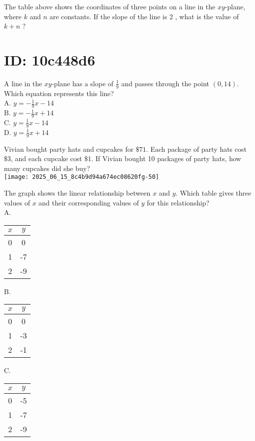 The table above shows the coordinates of three points on a line in the $x y$-plane, where $k$ and $n$ are constants. If the slope of the line is 2 , what is the value of $k+n$ ?

\section*{ID: 10c448d6}
A line in the $x y$-plane has a slope of $\frac{1}{9}$ and passes through the point $(0,14)$. Which equation represents this line?\\
A. $y=-\frac{1}{9} x-14$\\
B. $y=-\frac{1}{9} x+14$\\
C. $y=\frac{1}{9} x-14$\\
D. $y=\frac{1}{9} x+14$

Vivian bought party hats and cupcakes for $\$ 71$. Each package of party hats cost $\$ 3$, and each cupcake cost $\$ 1$. If Vivian bought 10 packages of party hats, how many cupcakes did she buy?\\
\texttt{[image: 2025\_06\_15\_8c4b9d94a674ec08620fg-50]}

The graph shows the linear relationship between $x$ and $y$. Which table gives three values of $x$ and their corresponding values of $y$ for this relationship?\\
A.

\begin{center}
\begin{tabular}{|c|c|}
\hline
$x$ & $y$ \\
\hline
0 & 0 \\
\hline
1 & -7 \\
\hline
2 & -9 \\
\hline
\end{tabular}
\end{center}

B.

\begin{center}
\begin{tabular}{|c|c|}
\hline
$x$ & $y$ \\
\hline
0 & 0 \\
\hline
1 & -3 \\
\hline
2 & -1 \\
\hline
\end{tabular}
\end{center}

C.

\begin{center}
\begin{tabular}{|c|c|}
\hline
$x$ & $y$ \\
\hline
0 & -5 \\
\hline
1 & -7 \\
\hline
2 & -9 \\
\hline
\end{tabular}
\end{center}

